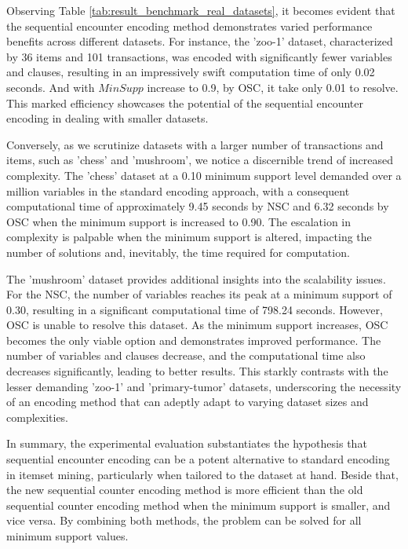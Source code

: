 Observing Table \ref{tab:result_benchmark_real_datasets}, it becomes evident
that the sequential encounter encoding method demonstrates varied performance benefits across different datasets.
For instance, the 'zoo-1' dataset, characterized by 36 items and 101 transactions,
was encoded with significantly fewer variables and clauses, resulting in an impressively swift computation time of
only 0.02 seconds. And with $MinSupp$ increase to 0.9, by OSC, it take only 0.01 to resolve.
This marked efficiency showcases the potential of the sequential encounter encoding in dealing with
smaller datasets.

Conversely, as we scrutinize datasets with a larger number of transactions and items,
such as 'chess' and 'mushroom', we notice a discernible trend of increased complexity.
The 'chess' dataset at a 0.10 minimum support level demanded over a million variables in the standard encoding approach,
with a consequent computational time of approximately 9.45 seconds by NSC
and 6.32 seconds by OSC when the minimum support is increased to 0.90.
The escalation in complexity is palpable when the minimum support is altered,
impacting the number of solutions and, inevitably, the time required for computation.

The 'mushroom' dataset provides additional insights into the scalability issues.
For the NSC, the number of variables reaches its peak at a minimum support of 0.30, resulting in a significant computational time of 798.24 seconds.
However, OSC is unable to resolve this dataset. As the minimum support increases, OSC becomes the only viable option and demonstrates improved performance.
The number of variables and clauses decrease, and the computational time also decreases significantly, leading to better results.
This starkly contrasts with the lesser demanding 'zoo-1' and 'primary-tumor' datasets,
underscoring the necessity of an encoding method that can adeptly adapt to varying dataset sizes and complexities.

In summary, the experimental evaluation substantiates the hypothesis that sequential encounter encoding can be a potent alternative to standard encoding in itemset mining,
particularly when tailored to the dataset at hand.
Beside that, the new sequential counter encoding method is more efficient than the old sequential counter encoding method when the minimum support is smaller, and vice versa.
By combining both methods, the problem can be solved for all minimum support values.
